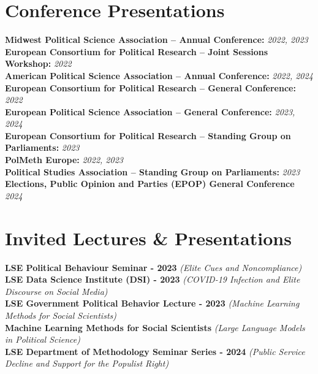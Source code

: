 \documentclass[letterpaper,11pt]{article}
\begin{document}
\section{Conference Presentations}
 \begin{itemize}[leftmargin=0.15in, label={}]
    \small{\item{
     \textbf{Midwest Political Science Association -- Annual Conference: }{\textit{2022, 2023}} \\
     \textbf{European Consortium for Political Research -- Joint Sessions Workshop: }{\textit{2022}} \\
     \textbf{American Political Science Association -- Annual Conference:}{\textit{ 2022, 2024}} \\
     \textbf{European Consortium for Political Research -- General Conference:}{\textit{ 2022}} \\
     \textbf{European Political Science Association -- General Conference:}{\textit{ 2023, 2024}} \\
     \textbf{European Consortium for Political Research -- Standing Group on Parliaments: }{\textit{ 2023}} \\
     \textbf{PolMeth Europe: }{\textit{ 2022, 2023}} \\
     \textbf{Political Studies Association -- Standing Group on Parliaments: }{\textit{2023}}\\
     \textbf{Elections, Public Opinion and Parties (EPOP) General Conference }{\textit{2024}}\\
    }}
 \end{itemize}



  \section{Invited Lectures \& Presentations}
 \begin{itemize}[leftmargin=0.15in, label={}]
    \small{\item{
     \textbf{LSE Political Behaviour Seminar - 2023 }{\textit{ (Elite Cues and Noncompliance)}} \\
     \textbf{LSE Data Science Institute (DSI) - 2023 }{\textit{ (COVID-19 Infection and Elite Discourse on Social Media)}} \\
     \textbf{LSE Government Political Behavior Lecture -  2023} {\textit{ (Machine Learning Methods for Social Scientists)}} \\
     \textbf{Machine Learning Methods for Social Scientists  }{\textit{ (Large Language Models in Political Science)}} \\
     \textbf{LSE Department of Methodology Seminar Series - 2024 }{\textit{ (Public Service Decline and Support for the Populist Right)}} \\
    }}
 \end{itemize}
\end{document}
